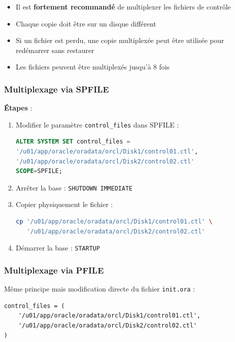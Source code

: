 \documentclass[12pt,a4paper]{article}
\begin{document}
\begin{itemize}
    \item Il est \textbf{fortement recommandé} de multiplexer les fichiers de contrôle
    \item Chaque copie doit être sur un disque différent
    \item Si un fichier est perdu, une copie multiplexée peut être utilisée pour redémarrer sans restaurer
    \item Les fichiers peuvent être multiplexés jusqu'à 8 fois
\end{itemize}

\subsubsection{Multiplexage via SPFILE}

\textbf{Étapes} :
\begin{enumerate}
    \item Modifier le paramètre \texttt{control\_files} dans SPFILE :
    \begin{lstlisting}[language=SQL]
ALTER SYSTEM SET control_files =
'/u01/app/oracle/oradata/orcl/Disk1/control01.ctl',
'/u01/app/oracle/oradata/orcl/Disk2/control02.ctl'
SCOPE=SPFILE;
    \end{lstlisting}
    
    \item Arrêter la base : \texttt{SHUTDOWN IMMEDIATE}
    
    \item Copier physiquement le fichier :
    \begin{lstlisting}[language=bash]
cp '/u01/app/oracle/oradata/orcl/Disk1/control01.ctl' \
   '/u01/app/oracle/oradata/orcl/Disk2/control02.ctl'
    \end{lstlisting}
    
    \item Démarrer la base : \texttt{STARTUP}
\end{enumerate}

\subsubsection{Multiplexage via PFILE}

Même principe mais modification directe du fichier \texttt{init.ora} :
\begin{lstlisting}
control_files = (
    '/u01/app/oracle/oradata/orcl/Disk1/control01.ctl',
    '/u01/app/oracle/oradata/orcl/Disk2/control02.ctl'
)
\end{lstlisting}
\end{document}
